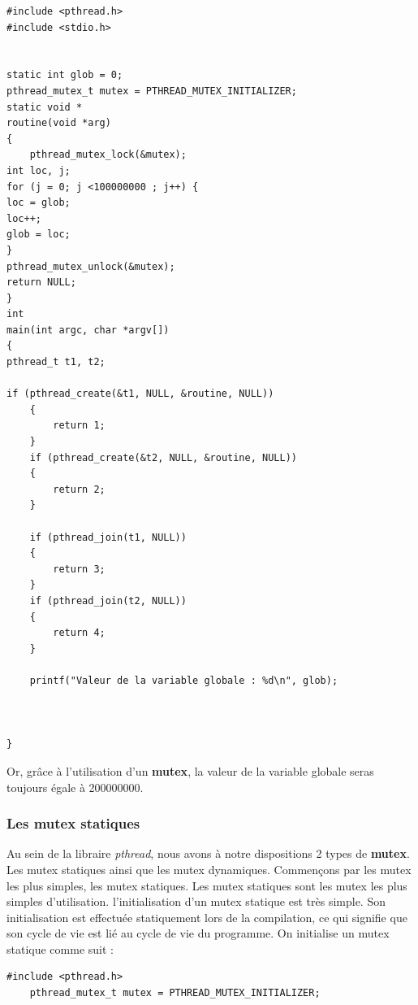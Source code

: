 \begin{lstlisting}[title = Utilisation mutex]
#include <pthread.h>
#include <stdio.h>


static int glob = 0;
pthread_mutex_t mutex = PTHREAD_MUTEX_INITIALIZER;
static void *
routine(void *arg)
{
    pthread_mutex_lock(&mutex);
int loc, j;
for (j = 0; j <100000000 ; j++) {
loc = glob;
loc++;
glob = loc;
}
pthread_mutex_unlock(&mutex);
return NULL;
}
int
main(int argc, char *argv[])
{
pthread_t t1, t2;

if (pthread_create(&t1, NULL, &routine, NULL))
	{
		return 1;
	}
	if (pthread_create(&t2, NULL, &routine, NULL))
	{
		return 2;
	}

	if (pthread_join(t1, NULL))
	{
		return 3;
	}
	if (pthread_join(t2, NULL))
	{
		return 4;
	}

	printf("Valeur de la variable globale : %d\n", glob);



}
\end{lstlisting}
\vspace{\baselineskip}

Or, grâce à l'utilisation d'un \textbf{mutex}, la valeur de la variable globale seras toujours égale à 200000000.

\subsubsection{Les mutex statiques}

Au sein de la libraire \textit{pthread}, nous avons à notre dispositions 2 types de \textbf{mutex}. Les mutex statiques ainsi que les mutex dynamiques. Commençons par les mutex les plus simples, les mutex statiques.
Les mutex statiques sont les mutex les plus simples d'utilisation. l'initialisation d'un mutex statique est très simple. Son initialisation est effectuée statiquement lors de la compilation, ce qui signifie que son cycle de vie est lié au cycle de vie du programme. On initialise un mutex statique comme suit : 
\\ 

\begin{lstlisting}[title = Initialisation mutex statique]
#include <pthread.h>
    pthread_mutex_t mutex = PTHREAD_MUTEX_INITIALIZER;
\end{lstlisting}
\vspace{\baselineskip}

